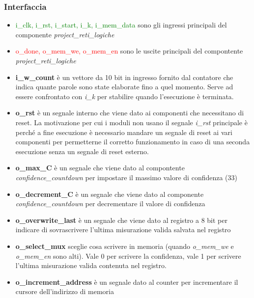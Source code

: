 \documentclass[12pt,a4paper]{scrartcl}
\begin{document}
        \subsubsection{Interfaccia}
            \begin{itemize}
                \item \textcolor{green}{i\_clk, i\_rst, i\_start, i\_k, i\_mem\_data} sono gli ingressi principali del componente \textit{project\_reti\_logiche}
                \item \textcolor{red}{o\_done, o\_mem\_we, o\_mem\_en} sono le uscite principali del compontente \textit{project\_reti\_logiche}
                \item \textbf{i\_w\_count} è un vettore da 10 bit in ingresso fornito dal contatore che indica quante parole sono state elaborate fino a quel momento. Serve ad essere confrontato con \textit{i\_k} per stabilire quando l'esecuzione è terminata.
                \item \textbf{o\_rst} è un segnale interno che viene dato ai componenti che necessitano di reset. La motivazione per cui i moduli non usano il segnale \textit{i\_rst} principale è perché a fine esecuzione è necessario mandare un segnale di reset ai vari componenti per permetterne il corretto funzionamento in caso di una seconda esecuzione senza un segnale di reset esterno.
                \item \textbf{o\_max\_C} è un segnale che viene dato al compontente \textit{confidence\_countdown} per impostare il massimo valore di confidenza (33)
                \item \textbf{o\_decrement\_C} è un segnale che viene dato al componente \textit{confidence\_countdown} per decrementare il valore di confidenza
                \item \textbf{o\_overwrite\_last} è un segnale che viene dato al registro a 8 bit per indicare di sovrascrivere l'ultima misurazione valida salvata nel registro
                \item \textbf{o\_select\_mux} sceglie cosa scrivere in memoria (quando \textit{o\_mem\_we} e \textit{o\_mem\_en} sono alti). Vale 0 per scrivere la confidenza, vale 1 per scrivere l'ultima misurazione valida contenuta nel registro.
                \item \textbf{o\_increment\_address} è un segnale dato al counter per incrementare il cursore dell'indirizzo di memoria
            \end{itemize}
\end{document}
